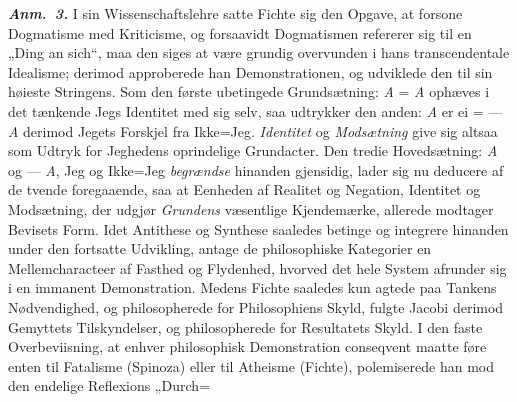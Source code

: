 \documentclass[12pt]{book}
\newcommand{\anm}[1]{\emph{\textbf{Anm.~#1.}}}
\newcommand{\opage}[1]{\marginnote{\footnotesize\textit{[#1]}}}
\begin{document}
\anm{3} I sin Wissenschaftslehre satte Fichte sig den Opgave, at forsone Dogmatisme
med Kriticisme, og forsaavidt Dogmatismen refererer sig til en „Ding an sich“, maa
den siges at være grundig overvunden i hans transcendentale Idealisme; derimod
approberede han Demonstrationen, og udviklede den til sin høieste Stringens. Som den
første ubetingede Grundsætning: \textit{A} = \textit{A} ophæves i det tænkende Jegs
Identitet med sig selv, saa udtrykker den anden: \textit{A} er ei =
--- \textit{A} derimod Jegets Forskjel fra Ikke=Jeg. \emph{Identitet} og
\emph{Modsætning} give sig altsaa som Udtryk for Jeghedens oprindelige Grundacter.
Den tredie Hovedsætning: \textit{A} og --- \textit{A}, Jeg og Ikke=Jeg
\emph{begrændse} hinanden gjensidig, lader sig nu deducere af de tvende foregaaende,
saa at Eenheden af Realitet og Negation, Identitet og Modsætning, der udgjør
\emph{Grundens} væsentlige Kjendemærke, allerede modtager Bevisets Form. Idet
Antithese og Synthese saaledes betinge og integrere hinanden under den fortsatte
Udvikling, antage de philosophiske Kategorier en Mellemcharacteer af Fasthed og
Flydenhed, hvorved det hele System afrunder sig i en immanent Demonstration. Medens
Fichte saaledes kun agtede paa Tankens Nødvendighed, og philosopherede for
Philosophiens Skyld, fulgte Jacobi derimod Gemyttets Tilskyndelser, og philosopherede
for Resultatets Skyld. I den faste Overbeviisning, at enhver philosophisk
Demonstration conseqvent maatte føre enten til Fatalisme (Spinoza) eller til Atheisme
(Fichte), polemiserede han mod den endelige Reflexions „Durch=
\opage{93} %
%
%
\end{document}
